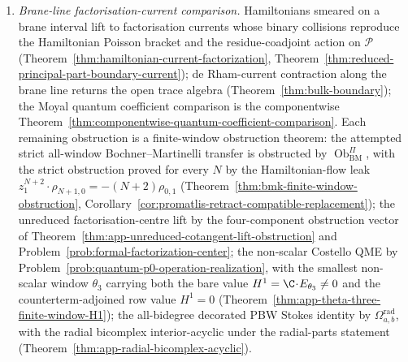 \documentclass[11pt]{memoir}
\begin{document}
\begin{enumerate}[wide=0pt,leftmargin=*]
    The cotangent module \(\mathcal P\) is the residue principal-part
    module, distinguished from the polynomial open BV/Koszul matrix
    model
    (Proposition~\ref{prop:polynomial-principal-part-boundary-obstruction},
    Theorem~\ref{thm:polynomial-realization-categorical-obstruction}) by the
    residue-coadjoint pole-raising action: linear Hamiltonians act
    locally nilpotently on polynomial observables and pole-raisingly
    on residues.
  \item \emph{Brane-line factorisation-current comparison.}
    Hamiltonians smeared on a brane interval lift to factorisation
    currents whose binary collisions reproduce the Hamiltonian
    Poisson bracket and the residue-coadjoint action on
    \(\mathcal P\)
    (Theorem~\ref{thm:hamiltonian-current-factorization},
    Theorem~\ref{thm:reduced-principal-part-boundary-current});
    de Rham-current contraction along the brane line returns the open
    trace algebra (Theorem~\ref{thm:bulk-boundary}); the Moyal
    quantum coefficient comparison is the componentwise
    Theorem~\ref{thm:componentwise-quantum-coefficient-comparison}.
    Each remaining obstruction is a finite-window obstruction
    theorem: the attempted strict all-window Bochner--Martinelli
    transfer is obstructed by
    \(\operatorname{Ob}^{\Pi}_{\mathrm{BM}}\), with the strict obstruction
    proved for every \(N\) by the Hamiltonian-flow leak
    \(z_1^{N+2}\!\cdot\!\rho_{N+1,0}=-(N+2)\rho_{0,1}\)
    (Theorem~\ref{thm:bmk-finite-window-obstruction},
    Corollary~\ref{cor:promatlis-retract-compatible-replacement}); the unreduced
    factorisation-centre lift by the four-component obstruction vector
    of Theorem~\ref{thm:app-unreduced-cotangent-lift-obstruction} and
    Problem~\ref{prob:formal-factorization-center}; the non-scalar
    Costello QME by
    Problem~\ref{prob:quantum-p0-operation-realization}, with the
    smallest non-scalar window \(\theta_3\) carrying both the bare
    value \(H^1=\C\!\cdot\!E_{\theta_3}\ne0\) and the
	    counterterm-adjoined row value \(H^1=0\)
    (Theorem~\ref{thm:app-theta-three-finite-window-H1}); the
    all-bidegree decorated PBW Stokes identity by
    \(\Omega^{\mathrm{rad}}_{a,b}\), with the radial bicomplex
    interior-acyclic under the radial-parts statement
    (Theorem~\ref{thm:app-radial-bicomplex-acyclic}).
\end{enumerate}
\end{document}
